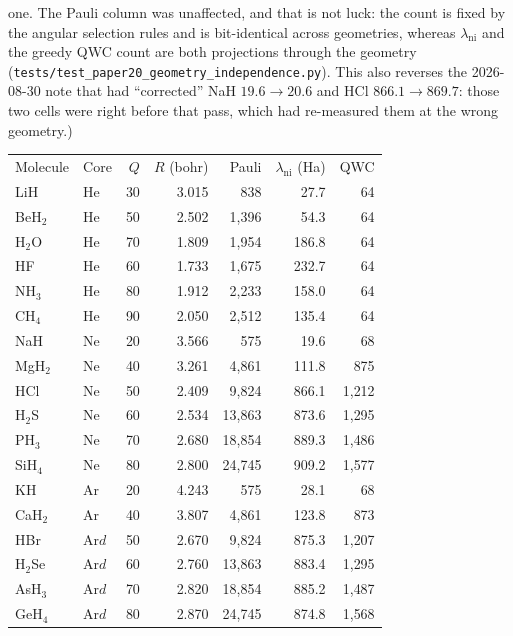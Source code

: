 \documentclass[twocolumn,pra,amsmath,amssymb,superscriptaddress]{revtex4-2}
\begin{document}
\begin{table}[h]
{  one.  The Pauli column was unaffected, and that is not luck: the count
  is fixed by the angular selection rules and is bit-identical across
  geometries, whereas $\lambda_{\text{ni}}$ and the greedy QWC count are
  both projections through the geometry
  (\texttt{tests/test\_paper20\_geometry\_independence.py}).  This also
  reverses the 2026-08-30 note that had ``corrected'' NaH
  $19.6 \to 20.6$ and HCl $866.1 \to 869.7$: those two cells were right
  before that pass, which had re-measured them at the wrong geometry.)}
\label{tab:molecules}
\begin{ruledtabular}
\begin{tabular}{llrrrrr}
Molecule & Core & $Q$ & $R$ (bohr) & Pauli & $\lambda_{\text{ni}}$ (Ha) & QWC \\
\colrule
LiH      & He   & 30 & 3.015 &    838 &  27.7 & 64 \\
BeH$_2$  & He   & 50 & 2.502 & 1{,}396 &  54.3 & 64 \\
H$_2$O   & He   & 70 & 1.809 & 1{,}954 & 186.8 & 64 \\
HF       & He   & 60 & 1.733 & 1{,}675 & 232.7 & 64 \\
NH$_3$   & He   & 80 & 1.912 & 2{,}233 & 158.0 & 64 \\
CH$_4$   & He   & 90 & 2.050 & 2{,}512 & 135.4 & 64 \\
\colrule
NaH      & Ne   & 20 & 3.566 &    575 &  19.6 &    68 \\
MgH$_2$  & Ne   & 40 & 3.261 & 4{,}861 & 111.8 &   875 \\
HCl      & Ne   & 50 & 2.409 & 9{,}824 & 866.1 & 1{,}212 \\
H$_2$S   & Ne   & 60 & 2.534 & 13{,}863 & 873.6 & 1{,}295 \\
PH$_3$   & Ne   & 70 & 2.680 & 18{,}854 & 889.3 & 1{,}486 \\
SiH$_4$  & Ne   & 80 & 2.800 & 24{,}745 & 909.2 & 1{,}577 \\
\colrule
KH       & Ar   & 20 & 4.243 &    575 &  28.1 &    68 \\
CaH$_2$  & Ar   & 40 & 3.807 & 4{,}861 & 123.8 &   873 \\
HBr      & Ar$d$ & 50 & 2.670 & 9{,}824 & 875.3 & 1{,}207 \\
H$_2$Se  & Ar$d$ & 60 & 2.760 & 13{,}863 & 883.4 & 1{,}295 \\
AsH$_3$  & Ar$d$ & 70 & 2.820 & 18{,}854 & 885.2 & 1{,}487 \\
GeH$_4$  & Ar$d$ & 80 & 2.870 & 24{,}745 & 874.8 & 1{,}568 \\
\end{tabular}
\end{ruledtabular}
\end{table}
\end{document}
